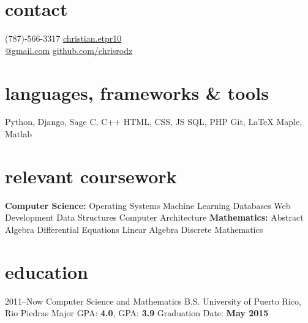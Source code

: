 \documentclass[]{friggeri-cv}
\begin{document}


\begin{aside} %
\section{contact}
(787)-566-3317
\href{mailto:christian.etpr10@gmail.com}{christian.etpr10 \\ @gmail.com}
\href{http://github.com/chrisrodz}{github.com/chrisrodz}
\section{languages, frameworks \& tools}
Python, Django, Sage
C, C++
HTML, CSS, JS
SQL, PHP
Git, LaTeX
Maple, Matlab
\section{relevant coursework}
\vspace{1em} \textbf{Computer Science:}
Operating Systems
Machine Learning
Databases
Web Development
Data Structures 
Computer Architecture\vspace{1em}
\textbf{Mathematics:}
Abstract Algebra
Differential Equations
Linear Algebra
Discrete Mathematics
\end{aside}


\section{education}

\begin{entrylist}
\entry
{2011--Now}
{Computer Science and Mathematics B.S.}
{University of Puerto Rico, Rio Piedras}
{Major GPA: \textbf{4.0}, GPA: \textbf{3.9} Graduation Date: \textbf{May 2015}}
\end{entrylist}
\end{document}
